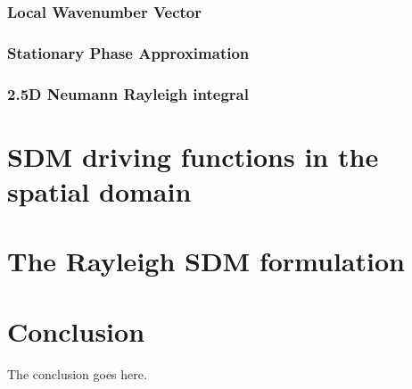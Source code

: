 \documentclass[journal]{IEEEtran}
\begin{document}
\subsubsection{Local Wavenumber Vector}
\subsubsection{Stationary Phase Approximation}
\subsubsection{2.5D Neumann Rayleigh integral}

\section{SDM driving functions in the spatial domain}

\section{The Rayleigh SDM formulation}


\section{Conclusion}
The conclusion goes here.



\ifCLASSOPTIONcaptionsoff
  \newpage
\fi



%
%
\end{document}
